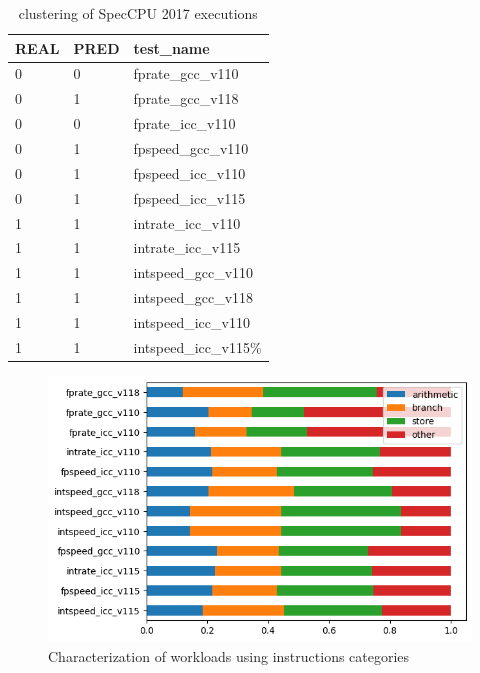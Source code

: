 \documentclass[]{PhDEngScITESO-R}
\begin{document}
\begin{table}[!ht]
    \centering
    \begin{tabular}{|l|l|l|}
    \hline
        REAL & PRED & test\_name \\ \hline
        0 & 0 & fprate\_gcc\_v110 \\ \hline
        0 & 1 & fprate\_gcc\_v118 \\ \hline
        0 & 0 & fprate\_icc\_v110 \\ \hline
        0 & 1 & fpspeed\_gcc\_v110 \\ \hline
        0 & 1 & fpspeed\_icc\_v110 \\ \hline
        0 & 1 & fpspeed\_icc\_v115 \\ \hline
        1 & 1 & intrate\_icc\_v110 \\ \hline
        1 & 1 & intrate\_icc\_v115 \\ \hline
        1 & 1 & intspeed\_gcc\_v110 \\ \hline
        1 & 1 & intspeed\_gcc\_v118 \\ \hline
        1 & 1 & intspeed\_icc\_v110 \\ \hline
        1 & 1 & intspeed\_icc\_v115\% \\ \hline
    \end{tabular}
    \caption{clustering of SpecCPU 2017 executions }
\label{table:2}
\end{table}

\begin{figure}[h]
    \centering
    \includegraphics[width=\textwidth] {Reporte IDI-2 ITESO/img/characterization_spec.png}
    \caption{Characterization of workloads using instructions categories}
    \label{fig:char_full}
\end{figure}
\end{document}
